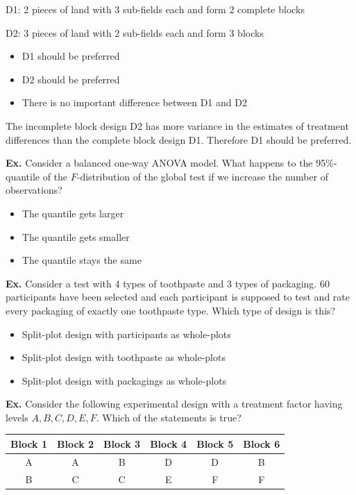 D1: 2 pieces of land with 3 sub-fields each and form 2 complete blocks\smallskip

D2: 3 pieces of land with 2 sub-fields each and form 3 blocks
\begin{itemize}
	\item[$\boxtimes$] D1 should be preferred
	\item[$\square$] D2 should be preferred
	\item[$\square$] There is no important difference between D1 and D2
\end{itemize}
The incomplete block design D2 has more variance in the estimates of treatment differences than the complete block design D1. Therefore D1 should be preferred.


\hrulefill

\textbf{Ex.} Consider a balanced one-way ANOVA model. What happens to the 95\%-quantile of the $F$-distribution of the global test if we increase the number of observations?
\begin{itemize}
	\item[$\square$] The quantile gets larger
	\item[$\boxtimes$] The quantile gets smaller
	\item[$\square$] The quantile stays the same
\end{itemize}


\hrulefill

\textbf{Ex.} Consider a test with 4 types of toothpaste and 3 types of packaging. 60 participants have been selected and each participant is supposed to test and rate every packaging of exactly one toothpaste type. Which type of design is this?
\begin{itemize}
	\item[$\boxtimes$] Split-plot design with participants as whole-plots
	\item[$\square$] Split-plot design with toothpaste as whole-plots
	\item[$\square$] Split-plot design with packagings as whole-plots
\end{itemize}


\hrulefill

\textbf{Ex.} Consider the following experimental design with a treatment factor having levels $A, B, C, D, E, F$. Which of the statements is true?
\begin{center}
	\begin{tabular}{c | c  | c | c | c | c}
		 Block 1 & Block 2 & Block 3 & Block 4 & Block 5 & Block 6\\ \hline
		 A & A & B & D & D & B \\
		 B & C & C & E & F & F
	\end{tabular}
\end{center}

